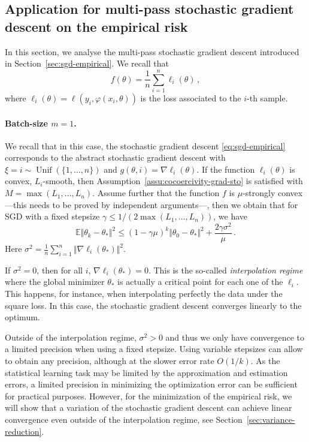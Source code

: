 \documentclass[11pt,reqno]{article}
\DeclareMathOperator{\Unif}{Unif}
\newcommand{\E}{\mathbb{E}}
\renewcommand{\leq}{\leqslant}
\numberwithin{equation}{section}
\theoremstyle{plain}
\theoremstyle{definition}
\theoremstyle{remark}
\begin{document}
\subsection{Application for multi-pass stochastic gradient descent on the empirical risk}
\label{sec:analysis-sgd-empirical}

In this section, we analyse the multi-pass stochastic gradient descent introduced in Section~\ref{sec:sgd-empirical}. We recall that 
\begin{equation*}
	f(\theta) = \frac{1}{n} \sum_{i=1}^n \ell_i(\theta) \, ,
\end{equation*}
where $\ell_i(\theta) = \ell(y_i, \varphi(x_i, \theta))$ is the loss associated to the $i$-th sample. 

\paragraph{Batch-size $m=1$.}
We recall that in this case, the stochastic gradient descent \eqref{eq:sgd-empirical} corresponds to the abstract stochastic gradient descent with $\xi = i \sim \Unif(\{1, \dots, n\})$ and $g(\theta, i) = \nabla \ell_i(\theta)$. If the function $\ell_i(\theta)$ is convex, $L_i$-smooth, then Assumption~\ref{assu:cocoercivity-grad-sto} is satisfied with $M = \max(L_1, \dots, L_n)$. Assume further that the function $f$ is $\mu$-strongly convex---this needs to be proved by independent arguments---, then we obtain that for SGD with a fixed stepsize $\gamma \leq 1/(2\max(L_1, \dots, L_n))$, we have 
\begin{equation*}
	\E \Vert \theta_k - \theta_* \Vert^2 \leq \left(1 - \gamma \mu\right)^k \Vert \theta_0 - \theta_* \Vert^2 + \frac{2\gamma \sigma^2}{\mu} \, .
\end{equation*}
Here $\sigma^2 = \frac{1}{n}\sum_{i=1}^{n} \Vert \nabla \ell_i(\theta_*) \Vert^2$. 

If $\sigma^2 = 0$, then for all $i$, $\nabla \ell_i(\theta_*) = 0$. This is the so-called \emph{interpolation regime} where the global minimizer $\theta_*$ is actually a critical point for each one of the $\ell_i$. This happens, for instance, when interpolating perfectly the data under the square loss. In this case, the stochastic gradient descent converges linearly to the optimum.

Outside of the interpolation regime, $\sigma^2 > 0$ and thus we only have convergence to a limited precision when using a fixed stepsize. Using variable stepsizes can allow to obtain any precision, although at the slower error rate $O(1/k)$. As the statistical learning task may be limited by the approximation and estimation errors, a limited precision in minimizing the optimization error can be sufficient for practical purposes. However, for the minimization of the empirical risk, we will show that a variation of the stochastic gradient descent can achieve linear convergence even outside of the interpolation regime, see Section~\ref{sec:variance-reduction}.
\end{document}
